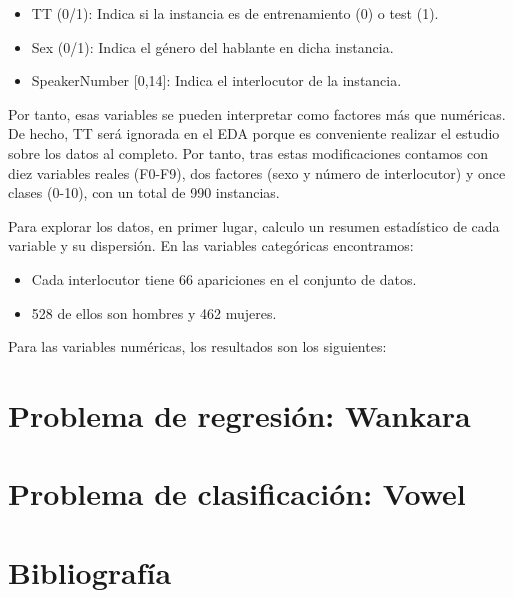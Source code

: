 \begin{itemize}
	\item TT (0/1): Indica si la instancia es de entrenamiento (0) o test (1).
	\item Sex (0/1): Indica el género del hablante en dicha instancia.
	\item SpeakerNumber [0,14]: Indica el interlocutor de la instancia.
\end{itemize}

Por tanto, esas variables se pueden interpretar como factores más que numéricas. De hecho, TT será ignorada en el EDA porque es conveniente realizar el estudio sobre los datos al completo. Por tanto, tras estas modificaciones contamos con diez variables reales (F0-F9), dos factores (sexo y número de interlocutor) y once clases (0-10), con un total de 990 instancias. 

Para explorar los datos, en primer lugar, calculo un resumen estadístico de cada variable y su dispersión. En las variables categóricas encontramos:

\begin{itemize}
	\item Cada interlocutor tiene 66 apariciones en el conjunto de datos.
	\item 528 de ellos son hombres y 462 mujeres.
\end{itemize}

Para las variables numéricas, los resultados son los siguientes:



\section{Problema de regresión: Wankara}






\section{Problema de clasificación: Vowel}


\newpage
\section{Bibliografía}




